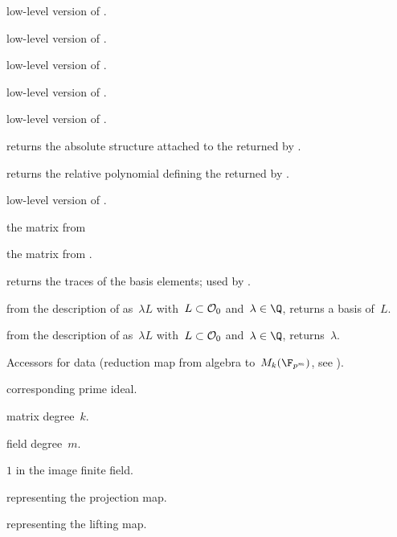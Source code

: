  low-level version of .

 low-level version of .

 low-level version of .

 low-level version of
.

low-level version of .

 returns the absolute 
structure attached to the  returned by .

  returns the relative polynomial
defining the  returned by .

low-level version of .

the matrix  from 

the matrix  from .

 returns the traces of the
basis elements; used by .

 from the description of 
as~$\lambda L$ with~$L\subset{\cal O}_0$ and~$\lambda\in\Q$, returns a basis
of~$L$.

 from the description of 
as~$\lambda L$ with~$L\subset{\cal O}_0$ and~$\lambda\in\Q$, returns~$\lambda$.

Accessors for  data (reduction map from algebra to~$M_k(\F_{p^m})$,
see ).

 corresponding prime ideal.

 matrix degree~$k$.

 field degree~$m$.

  $1$ in the image finite field.

  representing the projection map.

  representing the lifting map.

